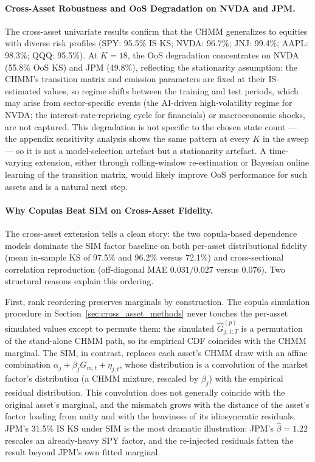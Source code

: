 \paragraph{Cross-Asset Robustness and OoS Degradation on NVDA and JPM.}
The cross-asset univariate results confirm that the CHMM generalizes to equities with diverse risk profiles (SPY: 95.5\% IS KS; NVDA: 96.7\%; JNJ: 99.4\%; AAPL: 98.3\%; QQQ: 95.5\%).
At $K = 18$, the OoS degradation concentrates on NVDA (55.8\% OoS KS) and JPM (49.8\%), reflecting the stationarity assumption: the CHMM's transition matrix and emission parameters are fixed at their IS-estimated values, so regime shifts between the training and test periods, which may arise from sector-specific events (the AI-driven high-volatility regime for NVDA; the interest-rate-repricing cycle for financials) or macroeconomic shocks, are not captured.
This degradation is not specific to the chosen state count --- the appendix sensitivity analysis shows the same pattern at every $K$ in the sweep --- so it is not a model-selection artefact but a stationarity artefact.
A time-varying extension, either through rolling-window re-estimation or Bayesian online learning of the transition matrix, would likely improve OoS performance for such assets and is a natural next step.

\paragraph{Why Copulas Beat SIM on Cross-Asset Fidelity.}
The cross-asset extension tells a clean story: the two copula-based dependence models dominate the SIM factor baseline on both per-asset distributional fidelity (mean in-sample KS of 97.5\% and 96.2\% versus 72.1\%) and cross-sectional correlation reproduction (off-diagonal MAE $0.031$/$0.027$ versus $0.076$).
Two structural reasons explain this ordering.

First, rank reordering preserves marginals by construction.
The copula simulation procedure in Section~\ref{sec:cross_asset_methods} never touches the per-asset simulated values except to permute them: the simulated $\hat{G}_{j,1:T}^{(p)}$ is a permutation of the stand-alone CHMM path, so its empirical CDF coincides with the CHMM marginal.
The SIM, in contrast, replaces each asset's CHMM draw with an affine combination $\alpha_j + \beta_j G_{m,t} + \eta_{j,t}$, whose distribution is a convolution of the market factor's distribution (a CHMM mixture, rescaled by $\beta_j$) with the empirical residual distribution.
This convolution does not generally coincide with the original asset's marginal, and the mismatch grows with the distance of the asset's factor loading from unity and with the heaviness of its idiosyncratic residuals.
JPM's 31.5\% IS KS under SIM is the most dramatic illustration: JPM's $\hat{\beta} = 1.22$ rescales an already-heavy SPY factor, and the re-injected residuals fatten the result beyond JPM's own fitted marginal.

